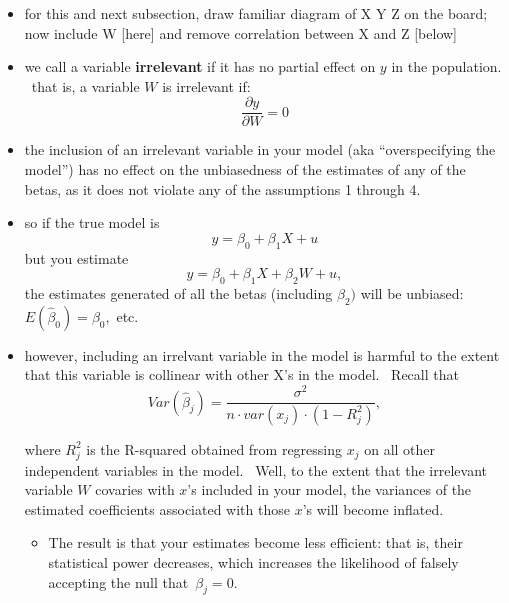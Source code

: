 \documentclass[11pt]{article}
\begin{document}
\begin{itemize}
\item \lbrack for this and next subsection, draw familiar diagram of X Y Z
on the board; now include W [here] and remove correlation between X and Z
[below]

\item we call a variable \textbf{irrelevant }if it has no partial effect on $%
y$ in the population. \ that is, a variable $W$ is irrelevant if:%
\begin{equation*}
\frac{\partial y}{\partial W}=0
\end{equation*}

\item the inclusion of an irrelevant variable in your model (aka
\textquotedblleft overspecifying the model\textquotedblright ) has no effect
on the unbiasedness of the estimates of any of the betas, as it does not
violate any of the assumptions 1 through 4.

\item so if the true model is%
\begin{equation*}
y=\beta _{0}+\beta _{1}X+u
\end{equation*}%
but you estimate%
\begin{equation*}
y=\beta _{0}+\beta _{1}X+\beta _{2}W+u,
\end{equation*}%
the estimates generated of all the betas (including $\beta _{2})$ will be
unbiased: \ $E(\widehat{\beta }_{0})=\beta _{0},$ etc. \ 

\item however, including an irrelvant variable in the model is harmful to
the extent that this variable is collinear with other X's in the model. \
Recall that 
\begin{equation*}
Var\left( \widehat{\beta }_{j}\right) =\frac{\sigma ^{2}}{n\cdot
var(x_{j})\cdot \left( 1-R_{j}^{2}\right) },
\end{equation*}

where $R_{j}^{2}$ is the R-squared obtained from regressing $x_{j}$ on all
other independent variables in the model. \ Well, to the extent that the
irrelevant variable $W$ covaries with $x$'s included in your model, the
variances of the estimated coefficients associated with those $x$'s will
become inflated.

\begin{itemize}
\item The result is that your estimates become less efficient: that is,
their statistical power decreases, which increases the likelihood of falsely
accepting the null that\ $\beta _{j}=0.$


\end{itemize}
\end{itemize}
\end{document}
